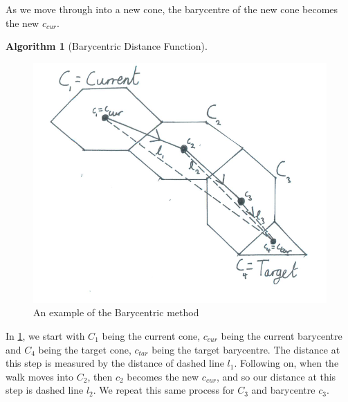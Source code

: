 \documentclass[12pt,a4paper]{report}
\newtheorem{algorithm}[theorem]{Algorithm}
\begin{document}
As we move through into a new cone, the barycentre of the new cone becomes the new $c_{cur}$.

\begin{algorithm}[Barycentric Distance Function]\
 \begin{algorithmic}[1]
 \STATE{$dist(l) = \sqrt{\sum_{i=1}^{n} (a_{i} - b_{i})^{2}}$.}
 \end{algorithmic}
 \end{algorithm}

\begin{figure}
\includegraphics[scale=0.5]{Chapters/images/Barycentre1.png}
\caption{An example of the Barycentric method}
\label{GoodBarycentre}
\end{figure}

In \ref{GoodBarycentre}, we start with $C_{1}$ being the current cone, $c_{cur}$ being the current barycentre and $C_{4}$ being the target cone, $c_{tar}$ being the target barycentre. The distance at this step is measured by the distance of dashed line $l_{1}$. Following on, when the walk moves into $C_{2}$, then $c_{2}$ becomes the new $c_{cur}$, and so our distance at this step is dashed line $l_{2}$. We repeat this same process for $C_{3}$ and barycentre $c_{3}$.
\end{document}
